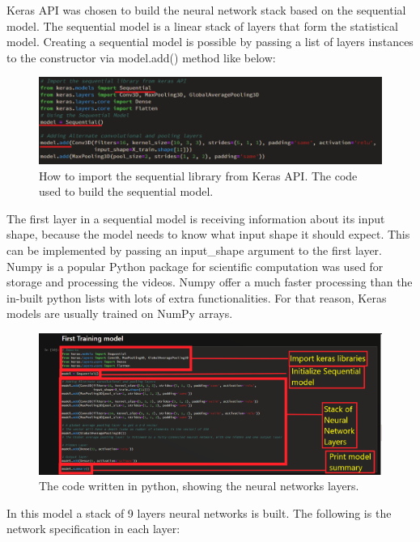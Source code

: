 Keras API was chosen to build the neural network stack based on the sequential model. The sequential model is a linear stack of layers that form the statistical model. Creating a sequential model is possible by passing a list of layers instances to the constructor via  model.add() method like below:
\begin{figure}[ht]
\centering
\includegraphics{Figures/se1}
\decoRule
\caption[How to import the sequential library from Keras API. The code used to build the sequential model.]{How to import the sequential library from Keras API. The code used to build the sequential model.}
\label{fig:la}
\end{figure}
The first layer in a sequential model is receiving information about its input shape, because the model needs to know what input shape it should expect. This can be implemented by passing an input\_shape argument to the first layer. \\

Numpy is a popular Python package for scientific computation was used for storage and processing the videos. Numpy offer a much faster processing than the in-built python lists with lots of extra functionalities. For that reason, Keras models are usually trained on NumPy arrays.

\begin{figure}[ht]
\centering
\includegraphics{Figures/suma1}
\decoRule
\caption[The code written in python, showing the neural networks layers.]{The code written in python, showing the neural networks layers.}
\label{fig:la}
\end{figure}
In this model a stack of 9 layers neural networks is built. The following is the network specification in each layer:

